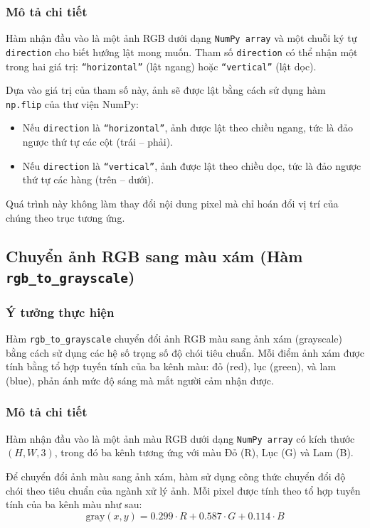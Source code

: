 \subsubsection*{Mô tả chi tiết}

Hàm nhận đầu vào là một ảnh RGB dưới dạng \texttt{NumPy array} và một chuỗi ký tự \texttt{direction} cho biết hướng lật mong muốn. Tham số \texttt{direction} có thể nhận một trong hai giá trị: \texttt{``horizontal''} (lật ngang) hoặc \texttt{``vertical''} (lật dọc).

Dựa vào giá trị của tham số này, ảnh sẽ được lật bằng cách sử dụng hàm \texttt{np.flip} của thư viện NumPy:
\begin{itemize}
  \item Nếu \texttt{direction} là \texttt{``horizontal''}, ảnh được lật theo chiều ngang, tức là đảo ngược thứ tự các cột (trái – phải).
  \item Nếu \texttt{direction} là \texttt{``vertical''}, ảnh được lật theo chiều dọc, tức là đảo ngược thứ tự các hàng (trên – dưới).
\end{itemize}

Quá trình này không làm thay đổi nội dung pixel mà chỉ hoán đổi vị trí của chúng theo trục tương ứng.

\subsection{Chuyển ảnh RGB sang màu xám (Hàm \texttt{rgb\_to\_grayscale})}

\subsubsection*{Ý tưởng thực hiện}

Hàm \texttt{rgb\_to\_grayscale} chuyển đổi ảnh RGB màu sang ảnh xám (grayscale) bằng cách sử dụng các hệ số trọng số độ chói tiêu chuẩn. Mỗi điểm ảnh xám được tính bằng tổ hợp tuyến tính của ba kênh màu: đỏ (red), lục (green), và lam (blue), phản ánh mức độ sáng mà mắt người cảm nhận được.

\subsubsection*{Mô tả chi tiết}

Hàm nhận đầu vào là một ảnh màu RGB dưới dạng \texttt{NumPy array} có kích thước \((H, W, 3)\), trong đó ba kênh tương ứng với màu Đỏ (R), Lục (G) và Lam (B).

Để chuyển đổi ảnh màu sang ảnh xám, hàm sử dụng công thức chuyển đổi độ chói theo tiêu chuẩn của ngành xử lý ảnh. Mỗi pixel được tính theo tổ hợp tuyến tính của ba kênh màu như sau:
\[
  \text{gray}(x, y) = 0.299 \cdot R + 0.587 \cdot G + 0.114 \cdot B
\]

